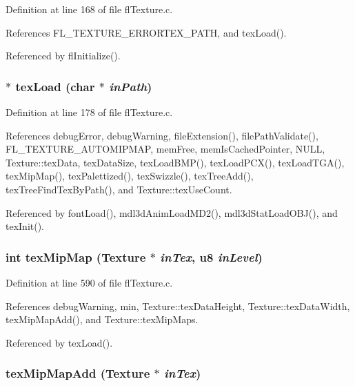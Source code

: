 Definition at line 168 of file fl\-Texture.c.

References FL\_\-TEXTURE\_\-ERRORTEX\_\-PATH, and tex\-Load().

Referenced by fl\-Initialize().
\subsubsection{$\ast$ tex\-Load (char $\ast$ {\em in\-Path})}\label{flTexture_8c_723acca77c2b47c9f8f9d1064ee509ee}




Definition at line 178 of file fl\-Texture.c.

References debug\-Error, debug\-Warning, file\-Extension(), file\-Path\-Validate(), FL\_\-TEXTURE\_\-AUTOMIPMAP, mem\-Free, mem\-Is\-Cached\-Pointer, NULL, Texture::tex\-Data, tex\-Data\-Size, tex\-Load\-BMP(), tex\-Load\-PCX(), tex\-Load\-TGA(), tex\-Mip\-Map(), tex\-Palettized(), tex\-Swizzle(), tex\-Tree\-Add(), tex\-Tree\-Find\-Tex\-By\-Path(), and Texture::tex\-Use\-Count.

Referenced by font\-Load(), mdl3d\-Anim\-Load\-MD2(), mdl3d\-Stat\-Load\-OBJ(), and tex\-Init().
\subsubsection{\setlength{\rightskip}{0pt plus 5cm}int tex\-Mip\-Map ({\bf Texture} $\ast$ {\em in\-Tex}, u8 {\em in\-Level})}\label{flTexture_8c_ccd044292ceedac29759d5f3fb600e52}




Definition at line 590 of file fl\-Texture.c.

References debug\-Warning, min, Texture::tex\-Data\-Height, Texture::tex\-Data\-Width, tex\-Mip\-Map\-Add(), and Texture::tex\-Mip\-Maps.

Referenced by tex\-Load().
\subsubsection{ tex\-Mip\-Map\-Add ({\bf Texture} $\ast$ {\em in\-Tex})}\label{flTexture_8c_ef3fcbb2958ad0f0f4ece629b81b82e7}




